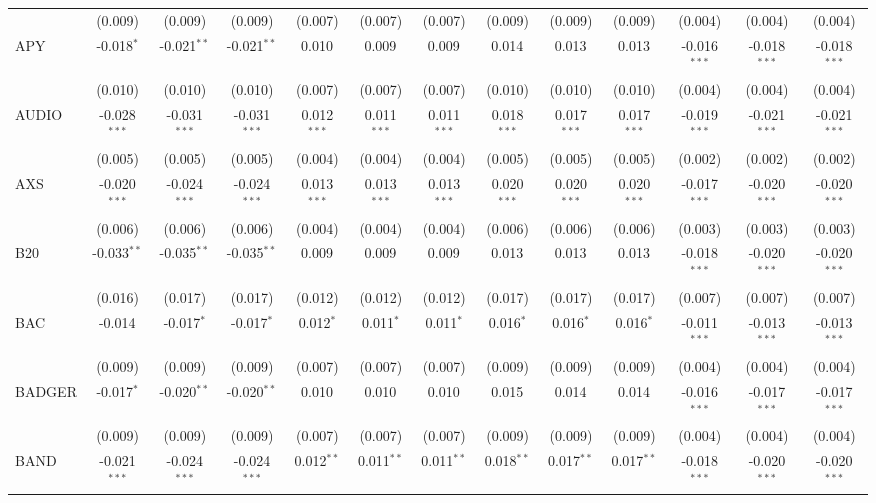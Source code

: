 \begin{table}[!htbp]
\begin{tabular}{@{\extracolsep{5pt}}lcccccccccccc}
  & (0.009) & (0.009) & (0.009) & (0.007) & (0.007) & (0.007) & (0.009) & (0.009) & (0.009) & (0.004) & (0.004) & (0.004) \\
 APY & -0.018$^{*}$ & -0.021$^{**}$ & -0.021$^{**}$ & 0.010$^{}$ & 0.009$^{}$ & 0.009$^{}$ & 0.014$^{}$ & 0.013$^{}$ & 0.013$^{}$ & -0.016$^{***}$ & -0.018$^{***}$ & -0.018$^{***}$ \\
  & (0.010) & (0.010) & (0.010) & (0.007) & (0.007) & (0.007) & (0.010) & (0.010) & (0.010) & (0.004) & (0.004) & (0.004) \\
 AUDIO & -0.028$^{***}$ & -0.031$^{***}$ & -0.031$^{***}$ & 0.012$^{***}$ & 0.011$^{***}$ & 0.011$^{***}$ & 0.018$^{***}$ & 0.017$^{***}$ & 0.017$^{***}$ & -0.019$^{***}$ & -0.021$^{***}$ & -0.021$^{***}$ \\
  & (0.005) & (0.005) & (0.005) & (0.004) & (0.004) & (0.004) & (0.005) & (0.005) & (0.005) & (0.002) & (0.002) & (0.002) \\
 AXS & -0.020$^{***}$ & -0.024$^{***}$ & -0.024$^{***}$ & 0.013$^{***}$ & 0.013$^{***}$ & 0.013$^{***}$ & 0.020$^{***}$ & 0.020$^{***}$ & 0.020$^{***}$ & -0.017$^{***}$ & -0.020$^{***}$ & -0.020$^{***}$ \\
  & (0.006) & (0.006) & (0.006) & (0.004) & (0.004) & (0.004) & (0.006) & (0.006) & (0.006) & (0.003) & (0.003) & (0.003) \\
 B20 & -0.033$^{**}$ & -0.035$^{**}$ & -0.035$^{**}$ & 0.009$^{}$ & 0.009$^{}$ & 0.009$^{}$ & 0.013$^{}$ & 0.013$^{}$ & 0.013$^{}$ & -0.018$^{***}$ & -0.020$^{***}$ & -0.020$^{***}$ \\
  & (0.016) & (0.017) & (0.017) & (0.012) & (0.012) & (0.012) & (0.017) & (0.017) & (0.017) & (0.007) & (0.007) & (0.007) \\
 BAC & -0.014$^{}$ & -0.017$^{*}$ & -0.017$^{*}$ & 0.012$^{*}$ & 0.011$^{*}$ & 0.011$^{*}$ & 0.016$^{*}$ & 0.016$^{*}$ & 0.016$^{*}$ & -0.011$^{***}$ & -0.013$^{***}$ & -0.013$^{***}$ \\
  & (0.009) & (0.009) & (0.009) & (0.007) & (0.007) & (0.007) & (0.009) & (0.009) & (0.009) & (0.004) & (0.004) & (0.004) \\
 BADGER & -0.017$^{*}$ & -0.020$^{**}$ & -0.020$^{**}$ & 0.010$^{}$ & 0.010$^{}$ & 0.010$^{}$ & 0.015$^{}$ & 0.014$^{}$ & 0.014$^{}$ & -0.016$^{***}$ & -0.017$^{***}$ & -0.017$^{***}$ \\
  & (0.009) & (0.009) & (0.009) & (0.007) & (0.007) & (0.007) & (0.009) & (0.009) & (0.009) & (0.004) & (0.004) & (0.004) \\
 BAND & -0.021$^{***}$ & -0.024$^{***}$ & -0.024$^{***}$ & 0.012$^{**}$ & 0.011$^{**}$ & 0.011$^{**}$ & 0.018$^{**}$ & 0.017$^{**}$ & 0.017$^{**}$ & -0.018$^{***}$ & -0.020$^{***}$ & -0.020$^{***}$ \\

\end{tabular}
\end{table}
